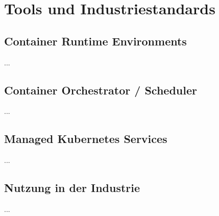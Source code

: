 \chapter{Tools und Industriestandards}
\label{ch:tools}
\section{Container Runtime Environments}
...
\section{Container Orchestrator / Scheduler}
...
\section{Managed Kubernetes Services}
...
\section{Nutzung in der Industrie}
...

